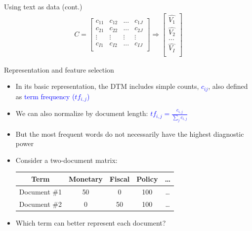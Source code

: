 \documentclass[english]{beamer}
\begin{document}
\begin{frame}{Using text as data (cont.)}
\begin{align*}
C = \begin{bmatrix}
c_{11} & c_{12} & ... & c_{1J} \\
c_{21} & c_{22} & ... & c_{2J} \\
\vdots & \vdots & \vdots & \vdots\\
c_{I1} & c_{I2} & ... & c_{IJ} \\
\end{bmatrix}\Rightarrow
\begin{bmatrix}
\hat{V_1}\\
\hat{V_2}\\
...\\
\hat{V_I}\\
\end{bmatrix}
\end{align*}
\end{frame}

\begin{frame}{Representation and feature selection}
\begin{itemize}
\setlength{\itemsep}{0.9em}
\item In its basic representation, the DTM includes simple counts, \textcolor{blue}{$c_{ij}$}, also defined as \textcolor{blue}{term frequency ($tf_{i,j}$)}
\item We can also normalize by document length: \textcolor{blue}{$tf_ {i,j}= \frac{c _ {i,j}} {\sum_{j}c_{i,j}}$}
%

\item But the most frequent words do not necessarily have the highest diagnostic power
\pause

\item Consider a two-document matrix:
\vspace{6pt}
\begin{center}
\begin{tabular}{c|c|c|c|c}
Term & Monetary & Fiscal  & Policy &  \dots \\ \hline
                     Document \#1 & 50 & 0 & 100 & \dots  \\ \hline
                     Document \#2 & 0 & 50 & 100   & \dots
\end{tabular}
\end{center}
\item Which term can better represent each document?
\end{itemize}
\end{frame}
\end{document}
